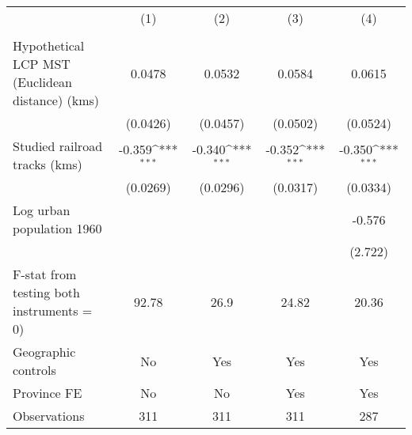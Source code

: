 {
\def\sym#1{\ifmmode^{#1}\else\(^{#1}\)\fi}
\begin{tabular}{l*{4}{c}}
\hline\hline
                &\multicolumn{1}{c}{(1)}&\multicolumn{1}{c}{(2)}&\multicolumn{1}{c}{(3)}&\multicolumn{1}{c}{(4)}\\
                &\multicolumn{1}{c}{}&\multicolumn{1}{c}{}&\multicolumn{1}{c}{}&\multicolumn{1}{c}{}\\
\hline
Hypothetical LCP MST (Euclidean distance) (kms)&   0.0478         &   0.0532         &   0.0584         &   0.0615         \\
                & (0.0426)         & (0.0457)         & (0.0502)         & (0.0524)         \\
[1em]
Studied railroad tracks (kms)&   -0.359\sym{***}&   -0.340\sym{***}&   -0.352\sym{***}&   -0.350\sym{***}\\
                & (0.0269)         & (0.0296)         & (0.0317)         & (0.0334)         \\
[1em]
Log urban population 1960&                  &                  &                  &   -0.576         \\
                &                  &                  &                  &  (2.722)         \\
\hline
F-stat from testing both instruments = 0)&    92.78         &     26.9         &    24.82         &    20.36         \\
Geographic controls&       No         &      Yes         &      Yes         &      Yes         \\
Province FE     &       No         &       No         &      Yes         &      Yes         \\
Observations    &      311         &      311         &      311         &      287         \\
\hline\hline
\end{tabular}
}
